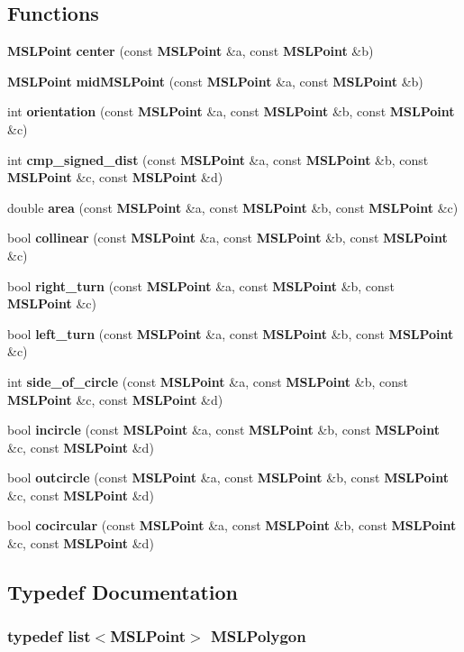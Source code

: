 \subsection*{Functions}
\begin{CompactItemize}
\item 
{\bf MSLPoint} {\bf center} (const {\bf MSLPoint} \&a, const {\bf MSLPoint} \&b)
\item 
{\bf MSLPoint} {\bf mid\-MSLPoint} (const {\bf MSLPoint} \&a, const {\bf MSLPoint} \&b)
\item 
int {\bf orientation} (const {\bf MSLPoint} \&a, const {\bf MSLPoint} \&b, const {\bf MSLPoint} \&c)
\item 
int {\bf cmp\_\-signed\_\-dist} (const {\bf MSLPoint} \&a, const {\bf MSLPoint} \&b, const {\bf MSLPoint} \&c, const {\bf MSLPoint} \&d)
\item 
double {\bf area} (const {\bf MSLPoint} \&a, const {\bf MSLPoint} \&b, const {\bf MSLPoint} \&c)
\item 
bool {\bf collinear} (const {\bf MSLPoint} \&a, const {\bf MSLPoint} \&b, const {\bf MSLPoint} \&c)
\item 
bool {\bf right\_\-turn} (const {\bf MSLPoint} \&a, const {\bf MSLPoint} \&b, const {\bf MSLPoint} \&c)
\item 
bool {\bf left\_\-turn} (const {\bf MSLPoint} \&a, const {\bf MSLPoint} \&b, const {\bf MSLPoint} \&c)
\item 
int {\bf side\_\-of\_\-circle} (const {\bf MSLPoint} \&a, const {\bf MSLPoint} \&b, const {\bf MSLPoint} \&c, const {\bf MSLPoint} \&d)
\item 
bool {\bf incircle} (const {\bf MSLPoint} \&a, const {\bf MSLPoint} \&b, const {\bf MSLPoint} \&c, const {\bf MSLPoint} \&d)
\item 
bool {\bf outcircle} (const {\bf MSLPoint} \&a, const {\bf MSLPoint} \&b, const {\bf MSLPoint} \&c, const {\bf MSLPoint} \&d)
\item 
bool {\bf cocircular} (const {\bf MSLPoint} \&a, const {\bf MSLPoint} \&b, const {\bf MSLPoint} \&c, const {\bf MSLPoint} \&d)
\end{CompactItemize}


\subsection{Typedef Documentation}
\subsubsection{\setlength{\rightskip}{0pt plus 5cm}typedef list$<${\bf MSLPoint}$>$ MSLPolygon}\label{point_h_a0}




